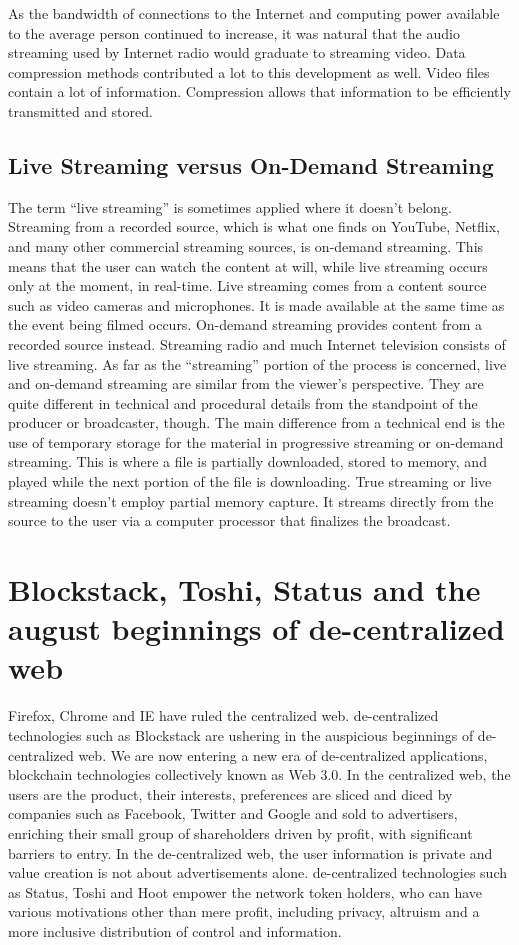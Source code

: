 \documentclass{article}
\begin{document}
As the bandwidth of connections to the Internet and computing power available to the average person continued to increase, it was natural that the audio streaming used by Internet radio would graduate to streaming video. Data compression methods contributed a lot to this development as well. Video files contain a lot of information. Compression allows that information to be efficiently transmitted and stored.

\subsection{Live Streaming versus On-Demand Streaming}
The term “live streaming” is sometimes applied where it doesn’t belong. Streaming from a recorded source, which is what one finds on YouTube, Netflix, and many other commercial streaming sources, is on-demand streaming. This means that the user can watch the content at will, while live streaming occurs only at the moment, in real-time. Live streaming comes from a content source such as video cameras and microphones. It is made available at the same time as the event being filmed occurs. On-demand streaming provides content from a recorded source instead. Streaming radio and much Internet television consists of live streaming.
As far as the “streaming” portion of the process is concerned, live and on-demand streaming are similar from the viewer’s perspective. They are quite different in technical and procedural details from the standpoint of the producer or broadcaster, though. The main difference from a technical end is the use of temporary storage for the material in progressive streaming or on-demand streaming. This is where a file is partially downloaded, stored to memory, and played while the next portion of the file is downloading. True streaming or live streaming doesn’t employ partial memory capture. It streams directly from the source to the user via a computer processor that finalizes the broadcast.

\section{Blockstack, Toshi, Status and the august beginnings of de-centralized
  web}
 Firefox, Chrome and IE have ruled the centralized web. de-centralized technologies
such as Blockstack are ushering in the auspicious beginnings of
de-centralized web. 
 We are now entering a new era of de-centralized applications, blockchain technologies collectively known as Web 3.0. In the centralized web, the users are the product,
their interests, preferences are sliced and diced by companies such as
Facebook, Twitter and Google and sold to advertisers, enriching their
small group of shareholders driven by profit, with significant barriers to entry. In the
de-centralized web, the user information is private and value creation is not about advertisements alone. de-centralized
technologies such as Status, Toshi and Hoot empower the network token
holders, who can have various motivations other than mere profit,
including privacy, altruism and a more inclusive distribution of
control and information.
\end{document}
